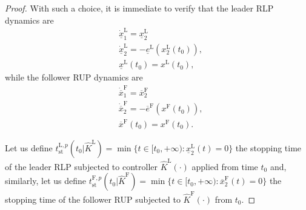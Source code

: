 \documentclass[letterpaper, 10 pt, conference]{ieeeconf}
\theoremstyle{definition}
\theoremstyle{nopoint}
\begin{document}
\begin{proof}
	With such a choice, it is immediate to verify that the  
	leader RLP dynamics are
	\begin{subequations}\label{eq:RLP_dynamics_K_hat}
		\begin{align}
			& \dot{\underline{x}}_1^\mathrm{L}=\underline{x}_2^\mathrm{L} \label{eq:RLP_dynamics_K_hat_dynamics}\\
			& \dot{\underline{x}}_2^\mathrm{L}=-\underline{e}^\mathrm{L}\left(x_2^\mathrm{L}(t_0)\right),\label{eq:RLP_dynamics_K_hat_constraints}\\
			& \underline{x}^\mathrm{L}(t_0)=x^\mathrm{L}(t_0), \label{eq:RLP_dynamics_K_hat_initial}
		\end{align}
	\end{subequations}
	while the follower RUP dynamics are
	\begin{subequations}\label{eq:RUP_dynamics_K_hat}
		\begin{align}
			& \dot{\overline{x}}_1^\mathrm{F}=\overline{x}_2^\mathrm{F} \label{eq:RUP_dynamics_K_hat_dynamics}\\
			& \dot{\overline{x}}_2^\mathrm{F}=-\overline{e}^\mathrm{F}\left(x^\mathrm{F}(t_0)\right),\label{eq:RUP_dynamics_K_hat_constraints}\\
			& \overline{x}^\mathrm{F}(t_0)=x^\mathrm{F}(t_0).
			\label{eq:RUP_dynamics_K_hat_initial}
		\end{align}
	\end{subequations}
	
	Let us define $t_{\mathrm{st}}^{\mathrm{L},p}(t_0 |\hat{K}^\mathrm{L})= \min\{t\in[t_0, +\infty): \underline{x}_2^\mathrm{L}(t)=0\}$ the stopping time of the leader RLP subjected to controller $\hat{K}^\mathrm{L}(\cdot)$ applied from time $t_0$ and, similarly, let us define $t_{\mathrm{st}}^{\mathrm{F},p}(t_0 |\hat{K}^\mathrm{F})= \min\{t\in[t_0, +\infty): \overline{x}_2^\mathrm{F}(t)=0\}$ the stopping time of the follower RUP subjected to $\hat{K}^\mathrm{F}(\cdot)$ from $t_0$. 
	

\end{proof}
\end{document}
